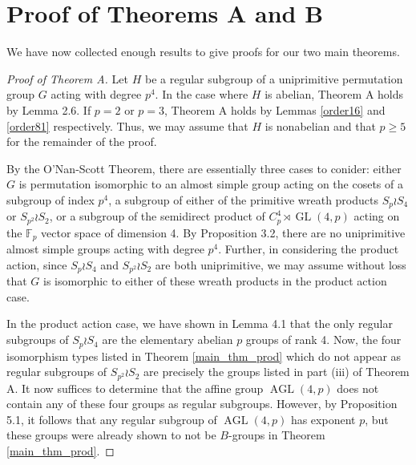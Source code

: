 \documentclass[12pt]{amsart}
\theoremstyle{definition}
\newcommand{\F}{\mathbb{F}}
\DeclareMathOperator{\GL}{GL}
\DeclareMathOperator{\AGL}{AGL}
\begin{document}
\section{Proof of Theorems A and B}

We have now collected enough results to give proofs for our two main theorems.

\begin{proof}[Proof of Theorem A]
	Let $H$ be a regular subgroup of a uniprimitive permutation group $G$ acting with degree $p^4$. In the case where $H$ is abelian, Theorem A holds by Lemma 2.6. If $p = 2$ or $p = 3$, Theorem A holds by Lemmas \ref{order16} and \ref{order81} respectively. Thus, we may assume that $H$ is nonabelian and that $p \geq 5$ for the remainder of the proof.
	
	By the O'Nan-Scott Theorem, there are essentially three cases to conider: either $G$ is permutation isomorphic to an almost simple group acting on the cosets of a subgroup of index $p^4$, a subgroup of either of the primitive wreath products $S_{p} \wr S_4$ or $S_{p^2} \wr S_2$, or a subgroup of the semidirect product of $C_p^4 \rtimes \GL(4,p)$ acting on the $\F_p$ vector space of dimension 4. By Proposition 3.2, there are no uniprimitive almost simple groups acting with degree $p^4$. Further, in considering the product action, since $S_{p} \wr S_4$ and $S_{p^2} \wr S_2$ are both uniprimitive, we may assume without loss that $G$ is isomorphic to either of these wreath products in the product action case. 
	
	In the product action case, we have shown in Lemma 4.1 that the only regular subgroups of $S_p \wr S_4$ are the elementary abelian $p$ groups of rank 4. Now, the four isomorphism types listed in Theorem \ref{main_thm_prod} which do not appear as regular subgroups of $S_{p^2} \wr S_2$ are precisely the groups listed in part (iii) of Theorem A. It now suffices to determine that the affine group $\AGL(4,p)$ does not contain any of these four groups as regular subgroups. However, by Proposition 5.1, it follows that any regular subgroup of $\AGL(4,p)$ has exponent $p$, but these groups were already shown to not be $B$-groups in Theorem \ref{main_thm_prod}. 
\end{proof}
\end{document}
